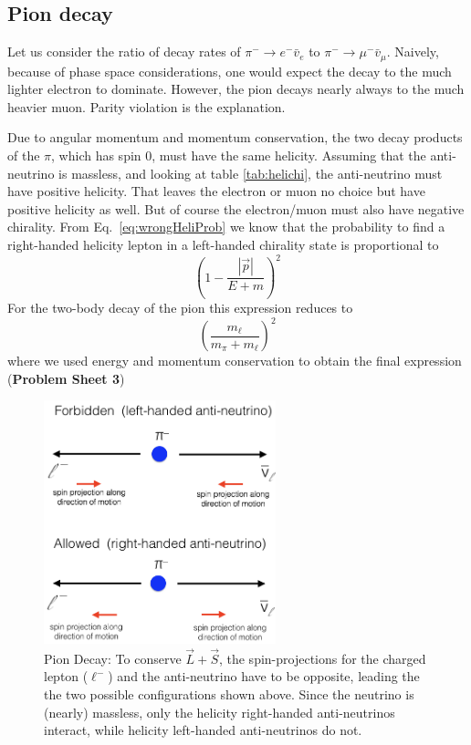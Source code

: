 \subsection{Pion decay} 
 Let us consider the ratio of decay rates of $\pi^- \to e^- \bar{v}_{e}$
 to $\pi^- \to \mu^- \bar{v}_{\mu}$. Naively, because of phase space
 considerations, one would expect the decay to the much lighter
 electron to dominate. However, the pion decays nearly always to the
 much heavier muon. Parity violation is the explanation.

 Due to angular momentum and momentum conservation, the two decay
 products of the $\pi$, which has spin 0, must have the same
 helicity. Assuming that the anti-neutrino is massless, and looking at
 table \ref{tab:helichi}, the anti-neutrino must have positive
 helicity. That leaves the electron or muon no choice but have
 positive helicity as well. But of course the electron/muon must also
 have negative chirality. From Eq.~\ref{eq:wrongHeliProb} we know that the probability
 to find a right-handed helicity lepton in a left-handed chirality state is
 proportional to
 \[
 \left(1-\frac{|\vec{p}|}{E+m}\right)^{2}
 \]
 For the two-body decay of the pion this expression reduces to
 \begin{equation}
 \label{eq:wrongHeliProbPion}
\left(\frac{m_{\ell}}{m_{\pi}+m_{\ell}}\right)^2
 \end{equation}
 where we used energy and momentum conservation to obtain the final expression
 ({\bf Problem Sheet 3})

\begin{figure}
\centering
\includegraphics[width=0.6\textwidth]{fig/0_pionDecay}
\caption[Pion Decay]{Pion Decay: To conserve $\vec{L} + \vec{S}$, the spin-projections for the charged lepton ($\ell^-$) and the anti-neutrino have to be opposite, leading the the two possible configurations shown above. Since the neutrino is (nearly) massless, only the helicity right-handed anti-neutrinos interact, while helicity left-handed anti-neutrinos do not.
\label{fig:my_label}}
\end{figure}

